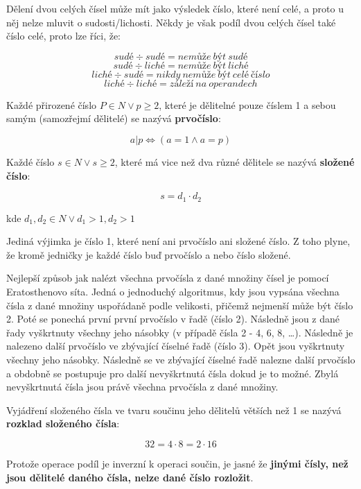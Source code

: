 Dělení dvou celých čísel může mít jako výsledek číslo, které není celé, a proto u něj nelze mluvit o sudosti/lichosti. Někdy je však podíl dvou celých čísel také číslo celé, proto lze říci, že:

$$ sudé \div sudé = nemůže~být~sudé $$
$$ sudé \div liché = nemůže~být~liché $$
$$ liché \div sudé = nikdy~nemůže~být~celé~číslo $$
$$ liché \div liché = záleží~na~operandech $$



Každé přirozené číslo $P\in N \vee p \geq 2$, které je dělitelné pouze číslem 1 a sebou samým (samozřejmí dělitelé) se nazývá {\bf prvočíslo}:

$$ a | p \Leftrightarrow (a = 1 \wedge a = p) $$

Každé číslo $ s\in N \vee s \geq 2 $, které má vice než dva různé dělitele se nazývá {\bf složené číslo}:

$$ s = d_1 \cdot d_2 $$

kde $ d_1,d_2 \in N \vee d_1 > 1, d_2 > 1 $

Jediná výjimka je číslo 1, které není ani prvočíslo ani složené číslo. Z toho plyne, že kromě jedničky je každé číslo buď prvočíslo a nebo číslo složené.


Nejlepší způsob jak nalézt všechna prvočísla z dané množiny čísel je pomocí Eratosthenovo síta. Jedná o jednoduchý algoritmus, kdy jsou vypsána všechna čísla z dané množiny uspořádaně podle velikosti, přičemž nejmenší může být číslo 2. Poté se ponechá první první prvočíslo v řadě (číslo 2). Následně jsou z dané řady vyškrtnuty všechny jeho násobky (v případě čísla 2 - 4, 6, 8, …). Následně je nalezeno další prvočíslo ve zbývající číselné řadě (číslo 3). Opět jsou vyškrtnuty všechny jeho násobky. Následně se ve zbývající číselné řadě nalezne další prvočíslo a obdobně se postupuje pro další nevyškrtnutá čísla dokud je to možné. Zbylá nevyškrtnutá čísla jsou právě všechna prvočísla z dané množiny.

\vskip 4mm
\centerline{}
\vskip 4mm


Vyjádření složeného čísla ve tvaru součinu jeho dělitelů větších než 1 se nazývá {\bf rozklad složeného čísla}:

$$ 32 = 4 \cdot 8 = 2\cdot 16$$

Protože operace podíl je inverzní k operaci součin, je jasné že {\bf jinými čísly, než jsou dělitelé daného čísla, nelze dané číslo rozložit}.

